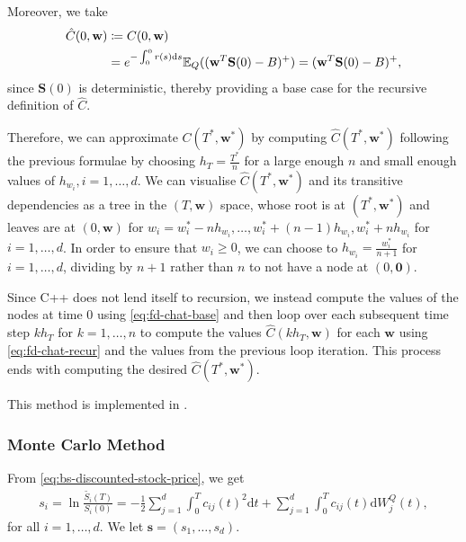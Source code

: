 \documentclass[english]{article}
\numberwithin{equation}{section}
\numberwithin{figure}{section}
\theoremstyle{bolddescit}
\theoremstyle{definition}
\theoremstyle{definition}
\theoremstyle{plain}
\theoremstyle{plain}
\theoremstyle{bolddesc}
\theoremstyle{plain}
\theoremstyle{remark}
\begin{document}
Moreover, we take
\begin{align}
  \hat{C}(0, \mathbf{w})
  &\coloneq C(0, \mathbf{w})\notag\\
  &= e^{-\int_0^0 r(s) \mathrm{d}s} \mathbb{E}_Q((\mathbf{w}^T \mathbf{S}(0) - B)^+)
  = (\mathbf{w}^T \mathbf{S}(0) - B)^+,\label{eq:fd-chat-base}
\end{align}
since $\mathbf{S}(0)$ is deterministic, thereby providing a base case for the recursive definition of $\hat{C}$.

Therefore, we can approximate $C(T^*, \mathbf{w}^*)$ by computing $\hat{C}(T^*, \mathbf{w}^*)$ following the previous formulae by choosing $h_T = \frac{T^*}{n}$ for a large enough $n$ and small enough values of $h_{w_i}, i=1,\ldots,d$. We can visualise $\hat{C}(T^*, \mathbf{w}^*)$ and its transitive dependencies as a tree in the $(T,\mathbf{w})$ space, whose root is at $(T^*, \mathbf{w}^*)$ and leaves are at $(0,\mathbf{w})$ for $w_i = w_i^* - n h_{w_i}, \ldots, w_i^* + (n-1) h_{w_i}, w_i^* + n h_{w_i}$ for $i=1,\ldots,d$. In order to ensure that $w_i \ge 0$, we can choose to $h_{w_i} = \frac{w_i^*}{n+1}$ for $i=1,\ldots,d$, dividing by $n+1$ rather than $n$ to not have a node at $(0,\mathbf{0})$.

Since C++ does not lend itself to recursion, we instead compute the values of the nodes at time 0 using \eqref{eq:fd-chat-base} and then loop over each subsequent time step $k h_T$ for $k=1,\ldots,n$ to compute the values $\hat{C}(k h_T, \mathbf{w})$ for each $\mathbf{w}$ using \eqref{eq:fd-chat-recur} and the values from the previous loop iteration. This process ends with computing the desired $\hat{C}(T^*, \mathbf{w}^*)$.

This method is implemented in .

\subsubsection{Monte Carlo Method}

From \eqref{eq:bs-discounted-stock-price}, we get
\begin{align*}
  s_i = \ln \frac{\widetilde{S_i}(T)}{S_i(0)} = - \frac{1}{2} \sum_{j=1}^{d} \int_0^T c_{ij}(t)^2 \mathrm{d}t + \sum_{j=1}^{d} \int_0^T c_{ij}(t) \mathrm{d}W^Q_j(t),
\end{align*}
for all $i=1,\ldots,d$. We let $\mathbf{s} = (s_1,\ldots,s_d)$.
\end{document}

